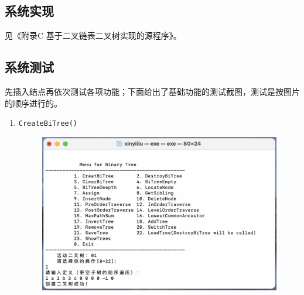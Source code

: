 \documentclass[supercite]{Experimental_Report}
\theoremstyle{definition}
\begin{document}
\subsection{系统实现}
见《附录C 基于二叉链表二叉树实现的源程序》。
\subsection{系统测试}
先插入结点再依次测试各项功能；下面给出了基础功能的测试截图，测试是按图片的顺序进行的。
\begin{enumerate}
	\item \verb|CreateBiTree()|
		\begin{figure}[!htb]
			\includegraphics[width=0.8\linewidth]{images/img02/截屏2023-06-04 21.13.12.png}
		\end{figure}
	\FloatBarrier
	

\end{enumerate}
\end{document}
